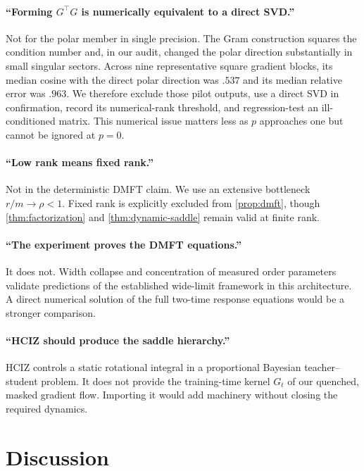 \documentclass[11pt]{article}
\newcommand{\1}{\mathbf 1}
\theoremstyle{plain}
\theoremstyle{definition}
\begin{document}
\paragraph{``Forming $G^\top G$ is numerically equivalent to a direct SVD.''}
Not for the polar member in single precision.  The Gram construction squares
the condition number and, in our audit, changed the polar direction
substantially in small singular sectors. Across nine representative square
gradient blocks, its median cosine with the direct polar direction was $.537$
and its median relative error was $.963$.  We therefore exclude those pilot
outputs, use a direct SVD in confirmation, record its numerical-rank
threshold, and regression-test an ill-conditioned matrix.  This numerical
issue matters less as $p$ approaches one but cannot be ignored at $p=0$.

\paragraph{``Low rank means fixed rank.''}
Not in the deterministic DMFT claim.  We use an extensive bottleneck
\(r/m\to\rho<1\).  Fixed rank is explicitly excluded from
\cref{prop:dmft}, though \cref{thm:factorization} and
\cref{thm:dynamic-saddle} remain valid at finite rank.

\paragraph{``The experiment proves the DMFT equations.''}
It does not.  Width collapse and concentration of measured order parameters
validate predictions of the established wide-limit framework in this
architecture.  A direct numerical solution of the full two-time response
equations would be a stronger comparison.

\paragraph{``HCIZ should produce the saddle hierarchy.''}
HCIZ controls a static rotational integral in a proportional Bayesian
teacher--student problem.  It does not provide the training-time kernel
\(G_t\) of our quenched, masked gradient flow.  Importing it would add
machinery without closing the required dynamics.

\section{Discussion}
\end{document}
